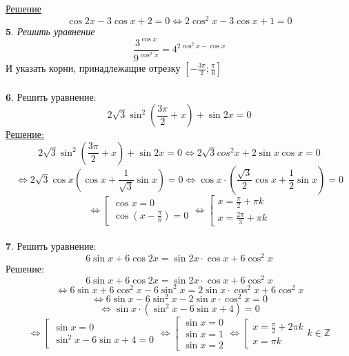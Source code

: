 \documentclass{article}
\begin{document}
\underline{Решение}
\\
\[
\cos 2x -3\cos x + 2 = 0
\Leftrightarrow
2\cos^2 x - 3\cos x + 1 = 0
\]
$\mathbf{5}$. \textit{Решить уравнение}
\[ \frac{3^{\cos x}}{9^{\cos^2 x}} = 4^{2 \cos^2 x - \cos x} \]
И указать корни, принадлежащие отрезку \( [-\frac{3\pi}{2}; \frac{\pi}{6}] \) \\ \\
$\mathbf{6}$. Решить уравнение:
\[ 2\sqrt{3} \sin^2 \left( \frac{3\pi}{2} + x\right) + \sin 2x = 0 \]
\underline{Решение:}
\[ 2\sqrt{3} \sin^2 \left( \frac{3\pi}{2} + x\right) + \sin 2x = 0 
\Leftrightarrow 2\sqrt{3} cos^2 x + 2\sin x \cos x = 0 \]
\[ \Leftrightarrow 2\sqrt{3} \cos x (\cos x + \frac{1}{\sqrt{3}} \sin x) = 0  
\Leftrightarrow \cos x \cdot (\frac{\sqrt{3}}{2} \cos x + \frac{1}{2} \sin x) = 0 \]
\begin{equation*}
    \Leftrightarrow
    \left[
    \begin{gathered}
    \cos x = 0
    \\
    \cos \left( x - \frac{\pi}{6} \right) = 0
    \end{gathered}
    \right.
    \Leftrightarrow 
    \left[
    \begin{gathered}
    x = \frac{\pi}{2} + \pi k
    \\
    x = \frac{2\pi}{3} + \pi k
    \end{gathered}
    \right.
\end{equation*}
\\
$\mathbf{7}$. Решить уравнение:
\[ 6\sin x + 6 \cos 2x = \sin 2x \cdot \cos x + 6\cos^2 x \]
Решение:
\[ 6\sin x + 6 \cos 2x = \sin 2x \cdot \cos x + 6\cos^2 x \]
\[ \Leftrightarrow 6\sin x + 6\cos^2 x - 6\sin^2 x = 2\sin x\cdot \cos^2 x + 6 \cos^2 x  \]
\[ \Leftrightarrow 6\sin x - 6\sin^2 x - 2\sin x \cdot \cos^2 x = 0\]
\[ \Leftrightarrow \sin x \cdot (\sin^2 x - 6\sin x + 4) = 0\]
\begin{equation*}
\Leftrightarrow
    \left[
    \begin{gathered}
    \sin x = 0
    \\
    \sin^2 x - 6\sin x + 4 = 0
    \end{gathered}
    \right.
    \Leftrightarrow
    \left[
    \begin{gathered}
    \sin x = 0
    \\
    \sin x = 1
    \\
    \sin x = 2
    \end{gathered}
    \right.
    \Leftrightarrow
    \left[
    \begin{gathered}
    x = \frac{\pi}{2} + 2\pi k
    \\
    x = \pi k
    \end{gathered}
    \right.
    k \in \mathbb{Z}
\end{equation*}
\end{document}
